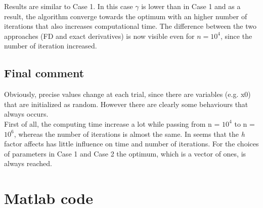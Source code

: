 \documentclass{article}
\begin{document}
\begin{table}[h!]
\centering

\label{table:2}
\end{table}


\begin{table}[h!]
\centering
 
\label{table:2}
\end{table}

Results are similar to Case 1. In this case $\gamma$ is lower than in Case 1 and as a result, the algorithm converge towards the optimum with an higher number of iterations that also increases computational time. The difference between the two approaches (FD and exact derivatives) is now visible even for $n=10^4$, since the number of iteration increased.


\subsection{Final comment}
Obviously, precise values change at each trial, since there are variables (e.g. x0) that
are initialized as random. However there are clearly some behaviours that always occurs.\\ First of all, the computing time increase a lot while passing from n = $10^4$ to n = $10^6$, whereas the number of iterations is almost the same. In seems that the \emph{h} factor affects has little influence on time and number of iterations. For the choices of parameters in Case 1 and Case 2 the optimum, which is a vector of ones, is always reached.
\section{Matlab code}
\end{document}
